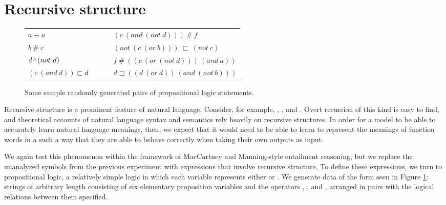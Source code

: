 \section{Recursive structure}

\begin{figure}[t]
\begin{center}
\begin{tabular}{lll}
$a\equiv a$		&~~~&	$(c~(and~(not~d)))~\#~f$\\
$b~\#~c$			&~~~&	$(not~(c~(or~b)))~\sqsubset~(not~c)$\\
$d\natneg(not~d)$	&~~~&	$f~\#~((c~(or~(not~d)))~(and~a))$\\
$(c~(and~d))\sqsubset d$&~~~&$d\sqsupset((d~(or~d))~(and~(not~b)))$\\
\end{tabular}
\end{center}

\caption{Some sample randomly generated pairs of propositional logic statements.  \label{prop-figure}} 
\end{figure}


Recursive structure is a prominent  feature of natural language. Consider, for example, , , and . Overt recursion of this kind is easy to find, and theoretical accounts of natural language syntax and semantics rely heavily on recursive structures.
In order for a model to be able to accurately learn natural language meanings, then, we expect that it would need to be able to learn to represent the meanings of function words in a such a way that they are able to behave correctly when taking their own outputs as input.


We again test this phenomenon within the framework of MacCartney and Manning-style entailment reasoning, but we replace the unanalyzed symbols from the previous experiment with expressions that involve recursive structure. To define these expressions, we turn to propositional logic, a relatively simple logic in which each variable represents either  or . We generate data of the form seen in Figure \ref{prop-figure}: strings of arbitrary length consisting of six elementary proposition variables and the operators , , and , arranged in pairs with the logical relations between them specified. 



